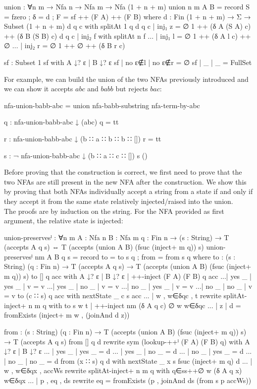 \begin{agda}
union : ∀{n m} → Nfa n → Nfa m → Nfa (1 + n + m)
union {n} {m} A B =
  record
    { S = fzero
    ; δ = d
    ; F = sf ++ (F A) ++ (F B)
    }
  where
    d : Fin (1 + n + m) → Σ → Subset (1 + n + m)
    d q c  with splitAt 1 q
    d q c | inj₁ z = ∅ {1} ++ (δ A (S A) c) ++ (δ B (S B) c)
    d q c | inj₂ f with splitAt n f
    ... | inj₁ l = ∅ {1} ++ (δ A l c) ++ ∅
    ... | inj₂ r = ∅ {1} ++ ∅ ++ (δ B r c)

    sf : Subset 1
    sf with A ↓? ε | B ↓? ε
    sf | no ε∉l | no ε∉r = ∅
    sf | _     | _       = FullSet
\end{agda}
For example, we can build the union of the two NFAs previously introduced and we can show it accepts $abc$ and $babb$ but rejects $bac$:
\begin{agda}
nfa-union-babb-abc = union nfa-babb-substring nfa-term-by-abc

q : nfa-union-babb-abc ↓ (abc)
q = tt

r : nfa-union-babb-abc ↓ (b ∷ a ∷ b ∷ b ∷ [])
r = tt

s : ¬ nfa-union-babb-abc ↓ (b ∷ a ∷ c ∷ [])
s ()
\end{agda}
Before proving that the construction is correct, we first need to prove that the two NFAs are still present in the new NFA after the construction. We show this by proving that both NFAs individually accept a string from a state if and only if they accept it from the same state relatively injected/raised into the union.\\
The proofs are by induction on the string. For the NFA provided as first argument, the relative state is injected:
\begin{agda}
union-preservesˡ : ∀{n m} {A : Nfa n} {B : Nfa m} {q : Fin n}
  → (s : String)
  → T (accepts A q s)
    ⇔
    T (accepts (union A B) (fsuc (inject+ m q)) s)
union-preservesˡ {n}{m} {A} {B} {q} s =
  record { to = to s q ; from = from s q }
  where
  to : (s : String) (q : Fin n)
    → T (accepts A q s)
    → T (accepts (union A B) (fsuc (inject+ m q)) s)
  to [] q acc with
      A ↓? ε
    | B ↓? ε
    | ++-inject (F A) (F B) q acc
  ...| yes _ | yes _ | v = v
  ...| yes _ | no  _ | v = v
  ...| no  _ | yes _ | v = v
  ...| no  _ | no  _ | v = v
  to (c ∷ s) q acc with nextState {_} {c} {s} acc
  ... | w , w∈δqc , t rewrite splitAt-inject+ n m q
                  with to s w t
                  | ++-inject {n}{m} (δ A q c) ∅ w w∈δqc
  ... | z | d = fromExists (inject+ m w , (joinAnd d z))

  from : (s : String) (q : Fin n)
    → T (accepts (union A B) (fsuc (inject+ m q)) s)
    → T (accepts A q s)
  from [] q d rewrite
        sym (lookup-++ˡ (F A) (F B) q)
    with A ↓? ε | B ↓? ε
  ... | yes _ | yes _  = d
  ... | yes _ | no  _  = d
  ... | no  _ | yes _  = d
  ... | no  _ | no  _  = d
  from (x ∷ s) q d with nextState {_} {x} {s} {fsuc (inject+ m q)} d
  ... | w , w∈δqx , accWs rewrite splitAt-inject+ n m q 
    with q∈ss++∅ w (δ A q x) w∈δqx
  ... | p , eq , ds rewrite eq =
    fromExists (p , joinAnd ds (from s p accWs))
\end{agda}
